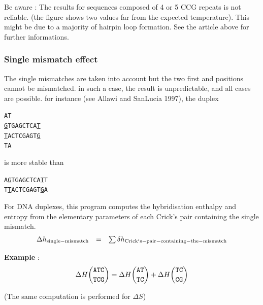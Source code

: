 \documentclass{article}
\begin{document}
Be aware : The results for sequences composed of 4 or 5 CCG repeats is not reliable. (the figure shows two values
far from the expected temperature). This might be due to a majority of hairpin loop formation. See the article
above for further informations.

\subsubsection{Single mismatch effect}

The single mismatches are taken into account but the two first and positions cannot
be mismatched. in such a case, the result is unpredictable, and all cases are
possible. for instance (see Allawi and SanLucia 1997), the duplex
\begin{alltt}
A          T  
 \underline{G}TGAGCTCA\underline{T}  
 \underline{T}ACTCGAGT\underline{G}  
T          A   
\end{alltt}

is more stable than 

\begin{alltt}
A\underline{G}TGAGCTCA\underline{T}T 
T\underline{T}ACTCGAGT\underline{G}A 
\end{alltt}

For DNA duplexes, this program computes the hybridisation enthalpy and entropy from the elementary 
parameters of each Crick's pair containing the single mismatch. 
\begin{displaymath}
  \begin{array}[t]{ccc}
  \Delta{}h_\mathrm{single-mismatch}&=&\sum \delta{}h_\mathrm{Crick's-pair-containing-the-mismatch}\\
  \end{array}
\end{displaymath}

\textbf{Example} :
\begin{multline*}
\Delta H {\mbox{\texttt{ATC}} \choose \mbox{\texttt{TCG}}} = 
\Delta H {\mbox{\texttt{AT}} \choose \mbox{\texttt{TC}} } + 
\Delta H {\mbox{\texttt{TC}} \choose \mbox{\texttt{CG}} } \\
\end{multline*}

       (The same computation is performed for $\Delta S$)
       
\end{document}
